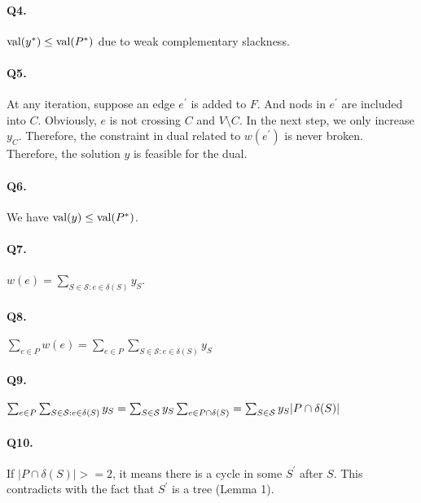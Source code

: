 \documentclass{article}
\begin{document}
\paragraph{Q4. }

$\text{val}(y^{*}) \le \text{val}(P^*)$ due to weak complementary slackness.

\paragraph{Q5. }

At any iteration, suppose an edge $e^{′}$ is added to $F$. And nods in $e^{'}$ are included into $C$. Obviously, $e$ is not crossing $C$ and $V \setminus C$. 
In the next step, we only increase $y_C$. Therefore, the constraint in dual related to $w(e^{'})$ is never broken. Therefore, the solution $y$ is feasible for the dual. 

\paragraph{Q6. }

We have $\text{val}(y) \le \text{val}(P^*)$.

\paragraph{Q7. }

$w(e) = \sum_{S \in \mathcal{S}: e \in \delta(S)} y_S$. 

\paragraph{Q8. }

$\sum_{e \in P} w(e) = \sum_{e \in P} \sum_{S \in \mathcal{S}: e \in \delta(S)} y_S$ 

\paragraph{Q9. }

$\sum_{e \in P} \sum_{S \in \mathcal{S}: e \in \delta(S)} y_S = \sum_{S \in \mathcal{S}} y_S \sum_{e \in P \cap \delta(S)} = \sum_{S \in \mathcal{S}} y_S |P \cap \delta(S)|$

\paragraph{Q10. }

If $|P\cap \delta(S)|>=2$, it means there is a cycle in some $S^{'}$ after $S$. This contradicts with the fact that $S^{'}$ is a tree (Lemma 1). 
\end{document}

